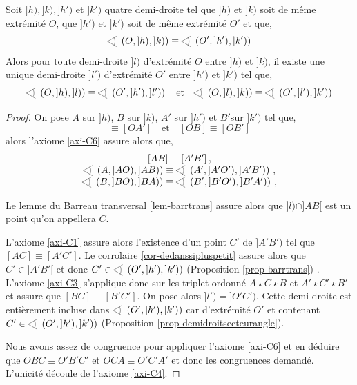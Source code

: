 \begin{thm}\label{thm-hilbert13}
    Soit $]h),]k),]h')$ et $]k')$ quatre demi-droite tel que $]h)$ et $]k)$ soit de même extrémité $O$, que $]h')$ et $]k')$ soit de même extrémité $O'$ et que,
    \begin{equation*}
        \anglesaillant \left(O,]h),]k)\right)\equiv\anglesaillant \left(O',]h'),]k')\right)
    \end{equation*}
    Alors pour toute demi-droite $]l)$ d'extrémité $O$ entre $]h)$ et $]k)$, il existe une unique demi-droite $]l')$ d'extrémité $O'$ entre $]h')$ et $]k')$ tel que,
    \begin{equation*}
        \anglesaillant \left(O,]h),]l)\right)\equiv\anglesaillant \left(O',]h'),]l')\right) \quad \text{et} \quad \anglesaillant \left(O,]l),]k)\right)\equiv\anglesaillant \left(O',]l'),]k')\right)
    \end{equation*}
\begin{proof}
    On pose $A$ sur $]h)$, $B$ sur $]k)$, $A'$ sur $]h')$ et $B'$sur $]k')$ tel que,
    \begin{equation*}
        [OA]\equiv[OA'] \quad \text{et} \quad [OB]\equiv[OB']
    \end{equation*}
    alors l'axiome \ref{axi-C6} assure alors que,
    \begin{equation*}
        \begin{array}{c}
            [AB]\equiv[A'B']\,, \\
            \anglesaillant \left(A,]AO),]AB)\right) \equiv \anglesaillant \left(A',]A'O'),]A'B')\right)\,, \\
            \anglesaillant \left(B,]BO),]BA)\right) \equiv \anglesaillant \left(B',]B'O'),]B'A')\right) \,, 
        \end{array}
    \end{equation*}

    Le lemme du Barreau transversal \ref{lem-barrtrans} assure alors que $]l)\cap ]AB[$ est un point qu'on appellera $C$. 

    L'axiome \ref{axi-C1} assure alors l'existence d'un point $C'$ de $]A'B')$ tel que $[AC]\equiv[A'C']$. %
    Le corrolaire \ref{cor-dedanssipluspetit} assure alors que $C'\in ]A'B'[$ et donc $C'\in \anglesaillant \left(O',]h'),]k')\right)$ (Proposition \ref{prop-barrtrans}) . L'axiome \ref{axi-C3} s'applique donc sur les triplet ordonné $A\star C\star B$ et $A' \star C' \star B'$ et assure que $[BC]\equiv [B'C']$. On pose alors $]l') = ]O'C')$. Cette demi-droite est entièrement incluse dans $\anglesaillant \left(O',]h'),]k')\right)$ car d'extrémité $O'$ et contenant $C'\in \anglesaillant \left(O',]h'),]k')\right)$ (Proposition \ref{prop-demidroitsecteurangle}).

    Nous avons assez de congruence pour appliquer l'axiome \ref{axi-C6} et en déduire que $OBC\equiv O'B'C'$ et $OCA\equiv O'C'A'$ et donc les congruences demandé.  L'unicité découle de l'axiome \ref{axi-C4}.
\end{proof}
\end{thm}
